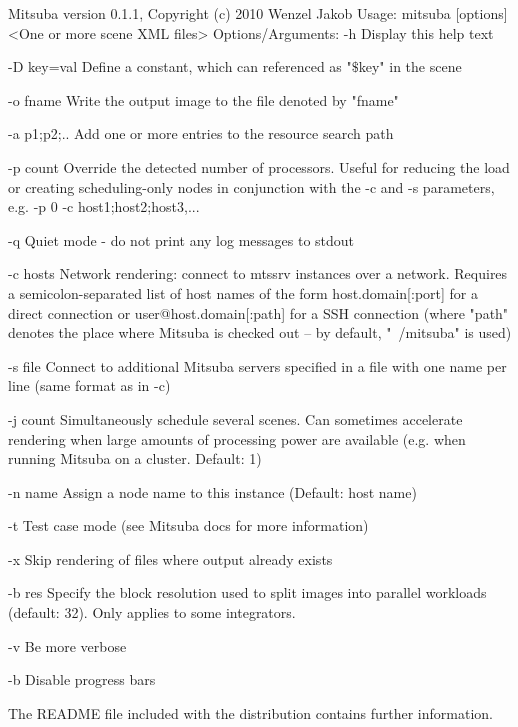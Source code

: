 \begin{console}[label=lst:mitsuba-cli,caption=Command line options of the \texttt{mitsuba} binary]
Mitsuba version 0.1.1, Copyright (c) 2010 Wenzel Jakob
Usage: mitsuba [options] <One or more scene XML files>
Options/Arguments:
   -h          Display this help text

   -D key=val  Define a constant, which can referenced as "$\texttt{\$}$key" in the scene

   -o fname    Write the output image to the file denoted by "fname"

   -a p1;p2;.. Add one or more entries to the resource search path

   -p count    Override the detected number of processors. Useful for reducing
               the load or creating scheduling-only nodes in conjunction with
               the -c and -s parameters, e.g. -p 0 -c host1;host2;host3,...

   -q          Quiet mode - do not print any log messages to stdout

   -c hosts    Network rendering: connect to mtssrv instances over a network.
               Requires a semicolon-separated list of host names of the form
                       host.domain[:port] for a direct connection
                 or
                       user@host.domain[:path] for a SSH connection (where
                       "path" denotes the place where Mitsuba is checked
                       out -- by default, "~/mitsuba" is used)

   -s file     Connect to additional Mitsuba servers specified in a file
               with one name per line (same format as in -c)

   -j count    Simultaneously schedule several scenes. Can sometimes accelerate
               rendering when large amounts of processing power are available
               (e.g. when running Mitsuba on a cluster. Default: 1)

   -n name     Assign a node name to this instance (Default: host name)

   -t          Test case mode (see Mitsuba docs for more information)

   -x          Skip rendering of files where output already exists

   -b res      Specify the block resolution used to split images into parallel
               workloads (default: 32). Only applies to some integrators.

   -v          Be more verbose

   -b          Disable progress bars

 The README file included with the distribution contains further information.
\end{console}
